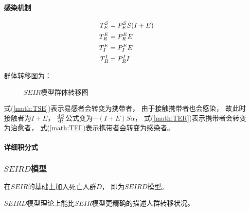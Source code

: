 \paragraph{感染机制}
\begin{align}
    T^{S}_{E}&=P^{S}_{E}S(I+E) \label{math:TSE} \\
    T^{E}_{R}&=P^{E}_{R}E     \label{math:TER}  \\
    T^{E}_{I}&=P^{E}_{I}E     \label{math:TEI}  \\
    T^{I}_{R}&=P^{I}_{R}I
\end{align}
\par 群体转移图为：
\begin{figure}[H]
    \centering
    \caption{$SEIR$模型群体转移图}
\end{figure}
\par 式(\ref{math:TSE})表示易感者会转变为携带者，
由于接触携带者也会感染，
故此时接触者为$I+E$，
$\frac{\mathrm{d}S}{\mathrm{d}t}$公式变为$-(I+E)S\alpha$，
式(\ref{math:TER})表示携带者会转变为治愈者，
式(\ref{math:TEI})表示携带者会转变为感染者。
\paragraph{详细积分式}
\SEIR
\subsubsection{$SEIRD$模型}
\par 在$SEIR$的基础上加入死亡人群$D$，
即为$SEIRD$模型。
\par $SEIRD$模型理论上能比$SEIR$模型更精确的描述人群转移状况。
